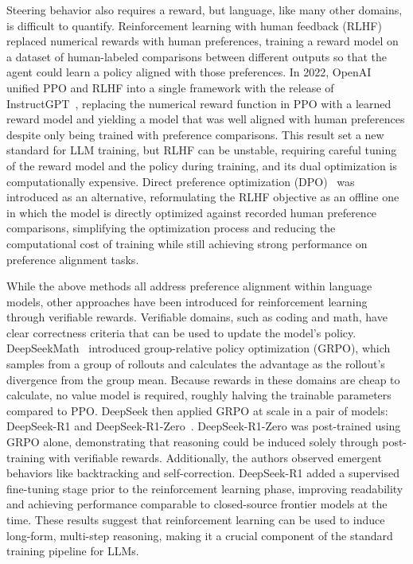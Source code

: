 Steering behavior also requires a reward, but language, like many other domains, is difficult to quantify. Reinforcement learning with human feedback (RLHF)~\cite{christiano2017rlhf} replaced numerical rewards with human preferences, training a reward model on a dataset of human-labeled comparisons between different outputs so that the agent could learn a policy aligned with those preferences. In 2022, OpenAI unified PPO and RLHF into a single framework with the release of InstructGPT~\cite{ouyang2022instructgpt}, replacing the numerical reward function in PPO with a learned reward model and yielding a model that was well aligned with human preferences despite only being trained with preference comparisons. This result set a new standard for LLM training, but RLHF can be unstable, requiring careful tuning of the reward model and the policy during training, and its dual optimization is computationally expensive. Direct preference optimization (DPO)~\cite{dpo} was introduced as an alternative, reformulating the RLHF objective as an offline one in which the model is directly optimized against recorded human preference comparisons, simplifying the optimization process and reducing the computational cost of training while still achieving strong performance on preference alignment tasks.

While the above methods all address preference alignment within language models, other approaches have been introduced for reinforcement learning through verifiable rewards. Verifiable domains, such as coding and math, have clear correctness criteria that can be used to update the model's policy. DeepSeekMath~\cite{shao2024deepseekmath} introduced group-relative policy optimization (GRPO), which samples from a group of rollouts and calculates the advantage as the rollout's divergence from the group mean. Because rewards in these domains are cheap to calculate, no value model is required, roughly halving the trainable parameters compared to PPO. DeepSeek then applied GRPO at scale in a pair of models: DeepSeek-R1 and DeepSeek-R1-Zero~\cite{guo2025deepseek}. DeepSeek-R1-Zero was post-trained using GRPO alone, demonstrating that reasoning could be induced solely through post-training with verifiable rewards. Additionally, the authors observed emergent behaviors like backtracking and self-correction. DeepSeek-R1 added a supervised fine-tuning stage prior to the reinforcement learning phase, improving readability and achieving performance comparable to closed-source frontier models at the time. These results suggest that reinforcement learning can be used to induce long-form, multi-step reasoning, making it a crucial component of the standard training pipeline for LLMs.

